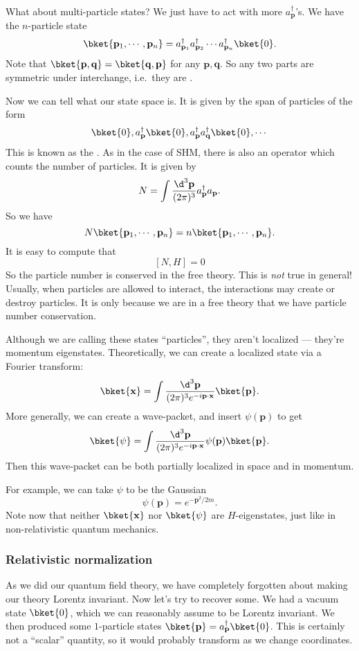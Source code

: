 \documentclass[a4paper]{article}
\begin{document}

What about multi-particle states? We just have to act with more $a_\mathbf{p}^\dagger$'s. We have the $n$-particle state
\[
  \bket{\mathbf{p}_1, \cdots, \mathbf{p}_n} = a_{\mathbf{p}_1}^\dagger a_{\mathbf{p}_2}^\dagger \cdots a_{\mathbf{p}_n}^\dagger \bket{0}.
\]
Note that $\bket{\mathbf{p}, \mathbf{q}} = \bket{\mathbf{q}, \mathbf{p}}$ for any $\mathbf{p}, \mathbf{q}$. So any two parts are symmetric under interchange, i.e.\ they are .

Now we can tell what our state space is. It is given by the span of particles of the form
\[
  \bket{0}, a_\mathbf{p}^\dagger \bket{0}, a_\mathbf{p}^\dagger a_\mathbf{q}^{\dagger}\bket{0}, \cdots
\]
This is known as the . As in the case of SHM, there is also an operator which counts the number of particles. It is given by
\[
  N = \int \frac{\d^3 \mathbf{p}}{(2\pi)^3} a_\mathbf{p}^\dagger a_\mathbf{p}.
\]
So we have
\[
  N\bket{\mathbf{p}_1, \cdots, \mathbf{p}_n} = n\bket{\mathbf{p}_1, \cdots, \mathbf{p}_n}.
\]
It is easy to compute that
\[
  [N, H] = 0
\]
So the particle number is conserved in the free theory. This is \emph{not} true in general! Usually, when particles are allowed to interact, the interactions may create or destroy particles. It is only because we are in a free theory that we have particle number conservation.

Although we are calling these states ``particles'', they aren't localized --- they're momentum eigenstates. Theoretically, we can create a localized state via a Fourier transform:
\[
  \bket{\mathbf{x}} = \int\frac{\d^3 \mathbf{p}}{(2\pi)^3 e^{-i\mathbf{p}\cdot \mathbf{x}}}\bket{\mathbf{p}}.
\]
More generally, we can create a wave-packet, and insert $\psi(\mathbf{p})$ to get
\[
  \bket{\psi} = \int\frac{\d^3 \mathbf{p}}{(2\pi)^3 e^{-i\mathbf{p}\cdot \mathbf{x}}}\psi(\mathbf{p})\bket{\mathbf{p}}.
\]
Then this wave-packet can be both partially localized in space and in momentum.

For example, we can take $\psi$ to be the Gaussian
\[
  \psi(\mathbf{p}) = e^{-\mathbf{p}^2/2m}.
\]
Note now that neither $\bket{\mathbf{x}}$ nor $\bket{\psi}$ are $H$-eigenstates, just like in non-relativistic quantum mechanics.

\subsubsection*{Relativistic normalization}
As we did our quantum field theory, we have completely forgotten about making our theory Lorentz invariant. Now let's try to recover some. We had a vacuum state $\bket{0}$, which we can reasonably assume to be Lorentz invariant. We then produced some $1$-particle states $\bket{\mathbf{p}} = a_\mathbf{p}^\dagger \bket{0}$. This is certainly not a ``scalar'' quantity, so it would probably transform as we change coordinates.
\end{document}
